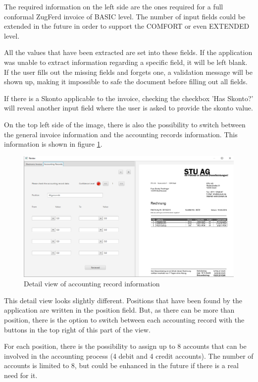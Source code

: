 The required information on the left side are the ones required for a full conformal ZugFerd invoice of BASIC level. The number of input fields could be extended in the future in order to support the COMFORT or even EXTENDED level.

All the values that have been extracted are set into these fields. If the application was unable to extract information regarding a specific field, it will be left blank. If the user fills out the missing fields and forgets one, a validation message will be shown up, making it impossible to safe the document before filling out all fields.

If there is a Skonto applicable to the invoice, checking the checkbox 'Has Skonto?' will reveal another input field where the user is asked to provide the skonto value.

On the top left side of the image, there is also the possibility to switch between the general invoice information and the accounting records information. This information is shown in figure \ref{reviewAR}.

\begin{figure}[ht!]
\centering
\includegraphics[width=\textwidth]{Images/GUI/reviewAR.png}
\caption{Detail view of accounting record information \label{reviewAR}}
\end{figure}

This detail view looks slightly different. Positions that have been found by the application are written in the position field. But, as there can be more than position, there is the option to switch between each accounting record with the buttons in the top right of this part of the view.

For each position, there is the possibility to assign up to 8 accounts that can be involved in the accounting process (4 debit and 4 credit accounts). The number of accounts is limited to 8, but could be enhanced in the future if there is a real need for it.


